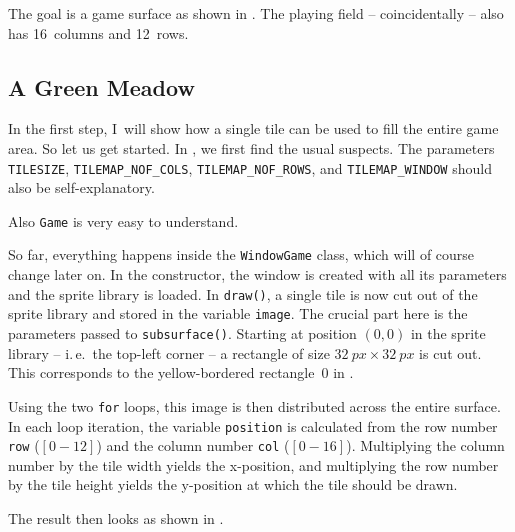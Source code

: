 The goal is a game surface as shown in . The playing field -- coincidentally -- also has \SI{16}{columns} and \SI{12}{rows}.


\subsection{A Green Meadow}

In the first step, I~will show how a single tile can be used to fill the entire game area. So let us get started. In , we first find the usual suspects. The parameters \texttt{TILESIZE}, \texttt{TILEMAP\_NOF\_COLS}, \texttt{TILEMAP\_NOF\_ROWS}, and \texttt{TILEMAP\_WINDOW} should also be self-explanatory.


Also \texttt{Game} is very easy to understand.


So far, everything happens inside the \texttt{WindowGame} class, which will of course change later on. In the constructor, the window is created with all its parameters and the sprite library is loaded. In \texttt{draw()}, a single tile is now cut out of the sprite library and stored in the variable \texttt{image}. The crucial part here is the parameters passed to \texttt{subsurface()}. Starting at position $(0,0)$ in the sprite library -- i.\,e.\ the top-left corner -- a rectangle of size $\SI{32}{px} \times \SI{32}{px}$ is cut out. This corresponds to the yellow-bordered rectangle~0 in .

Using the two \texttt{for} loops, this image is then distributed across the entire surface. In each loop iteration, the variable \texttt{position} is calculated from the row number \texttt{row} ($[0 - 12]$) and the column number \texttt{col} ($[0 - 16]$).  Multiplying the column number by the tile width yields the x-position, and multiplying the row number by the tile height yields the y-position at which the tile should be drawn.

The result then looks as shown in .

